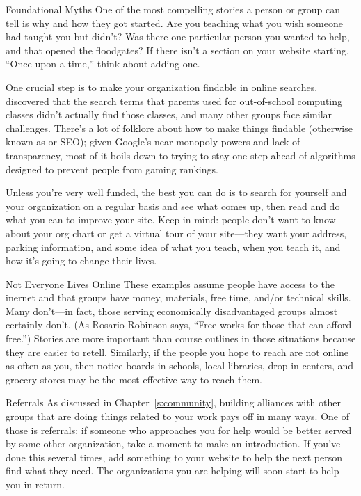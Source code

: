 \begin{aside}{Foundational Myths}
  One of the most compelling stories a person or group can tell is
  why and how they got started.
  Are you teaching what you wish someone had taught you but didn't?
  Was there one particular person you wanted to help,
  and that opened the floodgates?
  If there isn't a section on your website starting, ``Once upon a time,''
  think about adding one.
\end{aside}

One crucial step is to make your organization findable in online searches.
\cite{DiSa2014b} discovered that
the search terms that parents used for out-of-school computing classes
didn't actually find those classes,
and many other groups face similar challenges.
There's a lot of folklore about how to make things findable
(otherwise known as  or SEO);
given Google's near-monopoly powers and lack of transparency,
most of it boils down to trying to stay one step ahead of
algorithms designed to prevent people from gaming rankings.

Unless you're very well funded,
the best you can do is to search for yourself and your organization on a regular basis
and see what comes up,
then read 
and do what you can to improve your site.
Keep  in mind:
people don't want to know about your org chart or get a virtual tour of your site---they want your address,
parking information,
and some idea of what you teach,
when you teach it,
and how it's going to change their lives.

\begin{aside}{Not Everyone Lives Online}
  These examples assume people have access to the inernet
  and that groups have money, materials, free time, and/or technical skills.
  Many don't---in fact,
  those serving economically disadvantaged groups almost certainly don't.
  (As Rosario Robinson says, ``Free works for those that can afford free.'')
  Stories are more important than course outlines in those situations
  because they are easier to retell.
  Similarly,
  if the people you hope to reach are not online as often as you,
  then notice boards in schools,
  local libraries,
  drop-in centers,
  and grocery stores may be the most effective way to reach them.
\end{aside}

\begin{aside}{Referrals}
  As discussed in Chapter~\ref{s:community},
  building alliances with other groups that are doing things related to your work
  pays off in many ways.
  One of those is referrals:
  if someone who approaches you for help would be better served by some other organization,
  take a moment to make an introduction.
  If you've done this several times,
  add something to your website to help the next person find what they need.
  The organizations you are helping will soon start to help you in return.
\end{aside}


